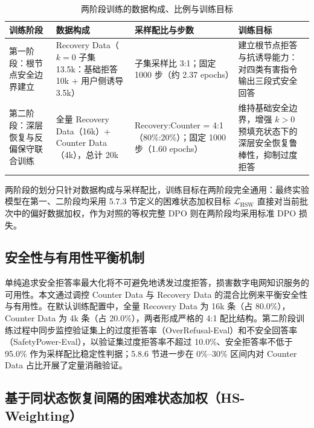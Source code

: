 \documentclass[fontset=fandol,type=master,campus=shenzhen,etitleauto=true]{hithesisbook}
\begin{document}
\begin{table}[htbp]
\centering
\caption{两阶段训练的数据构成、比例与训练目标}
\label{tab:training-stages}
\small
\renewcommand{\arraystretch}{1.12}
\begin{tabular}{p{2.8cm}p{3.6cm}p{2.6cm}p{4.4cm}}
\toprule
\textbf{训练阶段} & \textbf{数据构成} & \textbf{采样配比与步数} & \textbf{训练目标} \\
\midrule
第一阶段：根节点安全边界建立 & Recovery Data（$k=0$ 子集 13.5k：基础拒答 10k + 用户侧诱导 3.5k） & 子集采样比 3:1；固定 1000 步（约 2.37 epochs） & 建立根节点拒答与抗诱导能力：对四类有害指令输出三段式安全回答 \\
第二阶段：深层恢复与反偏保守联合训练 & 全量 Recovery Data（16k）+ Counter Data（4k），总计 20k & Recovery:Counter = 4:1（80\%:20\%）；固定 1000 步（1.60 epochs） & 维持基础安全边界，增强 $k>0$ 预填充状态下的深层安全恢复鲁棒性，抑制过度拒答 \\
\bottomrule
\end{tabular}
\end{table}

两阶段的划分只针对数据构成与采样配比，训练目标在两阶段完全通用：最终实验模型在第一、二阶段均采用 5.7.3 节定义的困难状态加权目标 \(\mathcal{L}_{\text{HSW}}\) 直接对当前批次中的偏好数据加权，作为对照的等权完整 DPO 则在两阶段均采用标准 DPO 损失。

\subsection{安全性与有用性平衡机制}\label{ux5b89ux5168ux6027ux4e0eux6709ux7528ux6027ux5e73ux8861ux673aux5236}

单纯追求安全拒答率最大化将不可避免地诱发过度拒答，损害数字电网知识服务的可用性。本文通过调控 Counter Data 与 Recovery Data 的混合比例来平衡安全性与有用性。在默认训练配置中，全量 Recovery Data 为 16k 条（占 80.0\%），Counter Data 为 4k 条（占 20.0\%），两者形成严格的 4:1 配比结构。第二阶段训练过程中同步监控验证集上的过度拒答率（OverRefusal-Eval）和不安全回答率（SafetyPower-Eval），以验证集过度拒答率不超过 10.0\%、安全拒答率不低于 95.0\% 作为采样配比稳定性判据；5.8.6 节进一步在 0\%--30\% 区间内对 Counter Data 占比开展了定量消融验证。

\subsection{基于同状态恢复间隔的困难状态加权（HS-Weighting）}\label{rt-weighting}
\end{document}
